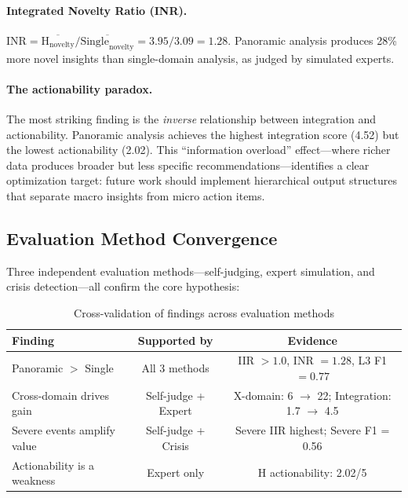 \documentclass[11pt,a4paper]{article}
\begin{document}
\paragraph{Integrated Novelty Ratio (INR).}
$\text{INR} = \overline{\text{H}_{\text{novelty}}} / \overline{\text{Single}_{\text{novelty}}} = 3.95 / 3.09 = 1.28$.
Panoramic analysis produces 28\% more novel insights than single-domain
analysis, as judged by simulated experts.

\paragraph{The actionability paradox.}
The most striking finding is the \emph{inverse} relationship between
integration and actionability. Panoramic analysis achieves the highest
integration score (4.52) but the lowest actionability (2.02). This ``information
overload'' effect---where richer data produces broader but less specific
recommendations---identifies a clear optimization target: future work should
implement hierarchical output structures that separate macro insights from
micro action items.

\subsection{Evaluation Method Convergence}

Three independent evaluation methods---self-judging, expert simulation, and
crisis detection---all confirm the core hypothesis:

\begin{table}[H]
\centering
\caption{Cross-validation of findings across evaluation methods}
\label{tab:convergence}
\begin{tabular}{lcc}
\toprule
\textbf{Finding} & \textbf{Supported by} & \textbf{Evidence} \\
\midrule
Panoramic $>$ Single & All 3 methods & IIR $> 1.0$, INR $= 1.28$, L3 F1 $= 0.77$ \\
Cross-domain drives gain & Self-judge + Expert & X-domain: 6 $\to$ 22; Integration: 1.7 $\to$ 4.5 \\
Severe events amplify value & Self-judge + Crisis & Severe IIR highest; Severe F1 = 0.56 \\
Actionability is a weakness & Expert only & H actionability: 2.02/5 \\
\bottomrule
\end{tabular}
\end{table}
\end{document}
